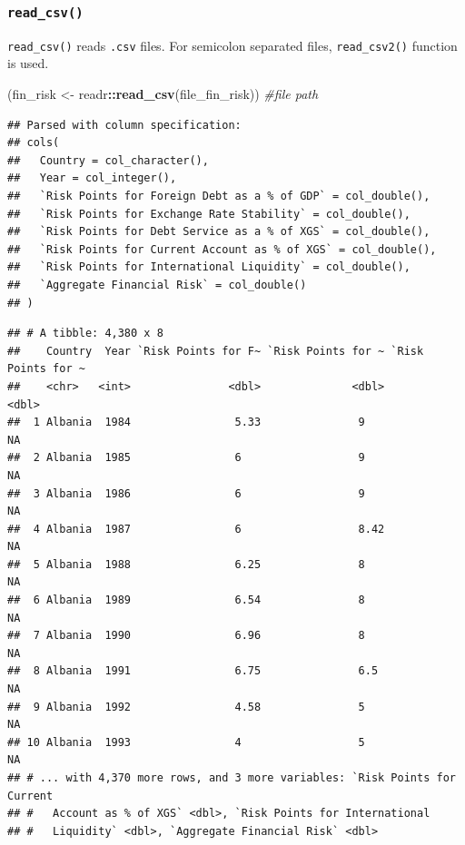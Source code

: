 \documentclass[11pt,]{article}
\newenvironment{Shaded}{\begin{snugshade}}{\end{snugshade}}
\newcommand{\KeywordTok}[1]{\textcolor[rgb]{0.13,0.29,0.53}{\textbf{#1}}}
\newcommand{\StringTok}[1]{\textcolor[rgb]{0.31,0.60,0.02}{#1}}
\newcommand{\CommentTok}[1]{\textcolor[rgb]{0.56,0.35,0.01}{\textit{#1}}}
\newcommand{\OperatorTok}[1]{\textcolor[rgb]{0.81,0.36,0.00}{\textbf{#1}}}
\newcommand{\NormalTok}[1]{#1}
\begin{document}
\subsubsection{\texorpdfstring{\texttt{read\_csv()}}{read\_csv()}}\label{read_csv}

\texttt{read\_csv()} reads \texttt{.csv} files. For semicolon separated
files, \texttt{read\_csv2()} function is used.

\begin{Shaded}
\begin{Highlighting}[]
\NormalTok{(fin_risk <-}\StringTok{ }\NormalTok{readr}\OperatorTok{::}\KeywordTok{read_csv}\NormalTok{(file_fin_risk)) }\CommentTok{#file path}
\end{Highlighting}
\end{Shaded}

\begin{verbatim}
## Parsed with column specification:
## cols(
##   Country = col_character(),
##   Year = col_integer(),
##   `Risk Points for Foreign Debt as a % of GDP` = col_double(),
##   `Risk Points for Exchange Rate Stability` = col_double(),
##   `Risk Points for Debt Service as a % of XGS` = col_double(),
##   `Risk Points for Current Account as % of XGS` = col_double(),
##   `Risk Points for International Liquidity` = col_double(),
##   `Aggregate Financial Risk` = col_double()
## )
\end{verbatim}

\begin{verbatim}
## # A tibble: 4,380 x 8
##    Country  Year `Risk Points for F~ `Risk Points for ~ `Risk Points for ~
##    <chr>   <int>               <dbl>              <dbl>              <dbl>
##  1 Albania  1984                5.33               9                    NA
##  2 Albania  1985                6                  9                    NA
##  3 Albania  1986                6                  9                    NA
##  4 Albania  1987                6                  8.42                 NA
##  5 Albania  1988                6.25               8                    NA
##  6 Albania  1989                6.54               8                    NA
##  7 Albania  1990                6.96               8                    NA
##  8 Albania  1991                6.75               6.5                  NA
##  9 Albania  1992                4.58               5                    NA
## 10 Albania  1993                4                  5                    NA
## # ... with 4,370 more rows, and 3 more variables: `Risk Points for Current
## #   Account as % of XGS` <dbl>, `Risk Points for International
## #   Liquidity` <dbl>, `Aggregate Financial Risk` <dbl>
\end{verbatim}
\end{document}
